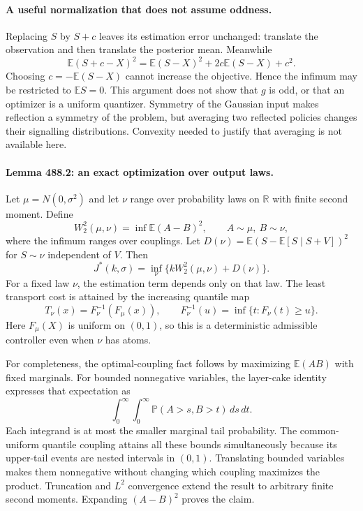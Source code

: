 \documentclass[11pt]{article}
\begin{document}
\paragraph{A useful normalization that does not assume oddness.}
Replacing $S$ by $S+c$ leaves its estimation error unchanged: translate
the observation and then translate the posterior mean. Meanwhile
\[
 \mathbb E(S+c-X)^2
 =\mathbb E(S-X)^2+2c\mathbb E(S-X)+c^2.
\]
Choosing $c=-\mathbb E(S-X)$ cannot increase the objective. Hence the
infimum may be restricted to $\mathbb ES=0$. This argument does not show
that $g$ is odd, or that an optimizer is a uniform quantizer. Symmetry of
the Gaussian input makes reflection a symmetry of the problem, but
averaging two reflected policies changes their signalling distributions.
Convexity needed to justify that averaging is not available here.

\paragraph{Lemma 488.2: an exact optimization over output laws.}
Let $\mu=N(0,\sigma^2)$ and let $\nu$ range over probability laws on
$\mathbb R$ with finite second moment. Define
\[
 W_2^2(\mu,\nu)=\inf\mathbb E(A-B)^2,
 \qquad A\sim\mu,\ B\sim\nu,
\]
where the infimum ranges over couplings. Let
$D(\nu)=\mathbb E(S-\mathbb E[S\mid S+V])^2$ for $S\sim\nu$
independent of $V$. Then
\begin{equation}\label{a488:transport}
 J^*(k,\sigma)=\inf_{\nu}\{kW_2^2(\mu,\nu)+D(\nu)\}.
\end{equation}
For a fixed law $\nu$, the estimation term depends only on that law.
The least transport cost is attained by the increasing quantile map
\[
 T_\nu(x)=F_\nu^{-1}(F_\mu(x)),\qquad
 F_\nu^{-1}(u)=\inf\{t:F_\nu(t)\ge u\}.
\]
Here $F_\mu(X)$ is uniform on $(0,1)$, so this is a deterministic
admissible controller even when $\nu$ has atoms.

For completeness, the optimal-coupling fact follows by maximizing
$\mathbb E(AB)$ with fixed marginals. For bounded nonnegative variables,
the layer-cake identity expresses that expectation as
\[
 \int_0^\infty\!\int_0^\infty
        \mathbb P(A>s,B>t)\,ds\,dt.
\]
Each integrand is at most the smaller marginal tail probability. The
common-uniform quantile coupling attains all these bounds simultaneously
because its upper-tail events are nested intervals in $(0,1)$. Translating
bounded variables makes them nonnegative without changing which coupling
maximizes the product. Truncation and $L^2$ convergence extend the result
to arbitrary finite second moments. Expanding $(A-B)^2$ proves the claim.
\end{document}
